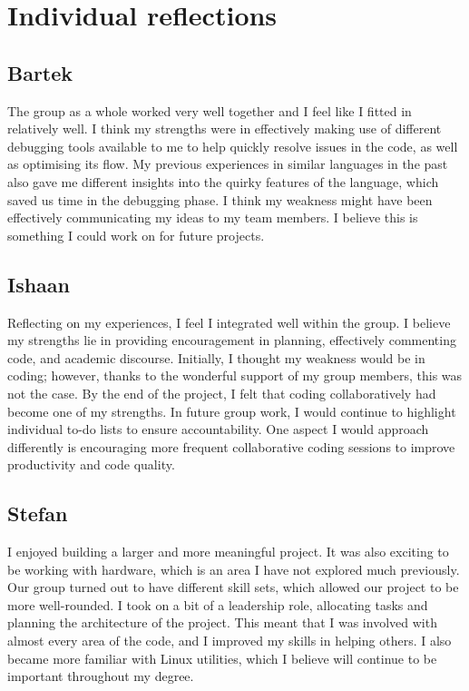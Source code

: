\documentclass{article}
\begin{document}
\section{Individual reflections}

\subsection{Bartek}
The group as a whole worked very well together and I feel like I fitted in relatively well. I think my strengths were in effectively making use of different debugging tools available to me to help quickly resolve issues in the code, as well as optimising its flow. My previous experiences in similar languages in the past also gave me different insights into the quirky features of the language, which saved us time in the debugging phase. I think my weakness might have been effectively communicating my ideas to my team members. I believe this is something I could work on for future projects.

\subsection{Ishaan}
Reflecting on my experiences, I feel I integrated well within the group. I believe my strengths lie in providing encouragement in planning, effectively commenting code, and academic discourse. Initially, I thought my weakness would be in coding; however, thanks to the wonderful support of my group members, this was not the case. By the end of the project, I felt that coding collaboratively had become one of my strengths. In future group work, I would continue to highlight individual to-do lists to ensure accountability. One aspect I would approach differently is encouraging more frequent collaborative coding sessions to improve productivity and code quality.

\subsection{Stefan}
I enjoyed building a larger and more meaningful project. It was also exciting to be working with hardware, which is an area I have not explored much previously. Our group turned out to have different skill sets, which allowed our project to be more well-rounded. I took on a bit of a leadership role, allocating tasks and planning the architecture of the project. This meant that I was involved with almost every area of the code, and I improved my skills in helping others. I also became more familiar with Linux utilities, which I believe will continue to be important throughout my degree.
\end{document}
